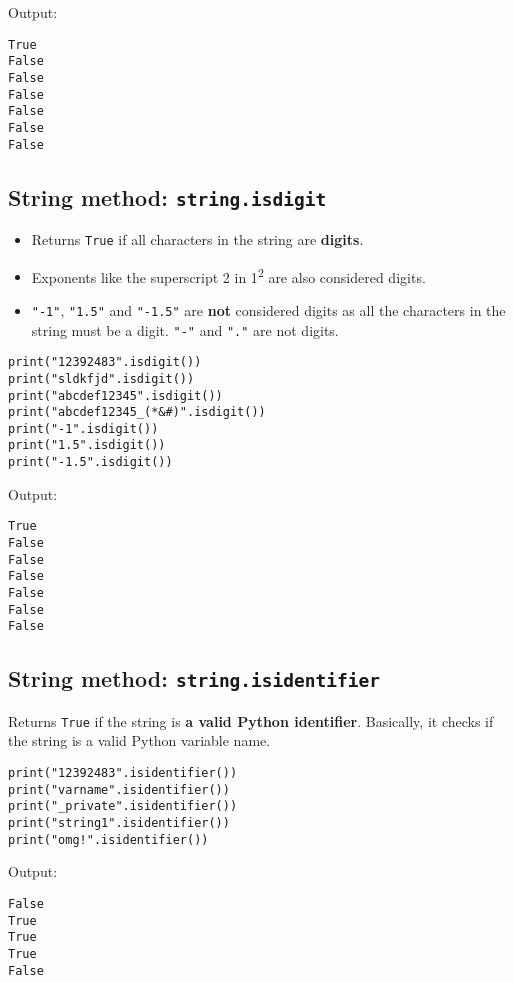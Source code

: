 \documentclass[11pt]{article}
\begin{document}
 \noindent Output:

\begin{verbatim}
True
False
False
False
False
False
False
\end{verbatim}


 \newpage

\subsection{String method: \texttt{string.isdigit}}
\label{sec:org322c0b2}
\begin{itemize}
\item Returns \texttt{True} if all characters in the string are \textbf{digits}.
\item Exponents like the superscript 2 in 1\textsuperscript{2} are also considered digits.
\item \texttt{"-1"}, \texttt{"1.5"} and \texttt{"-1.5"} are \textbf{not} considered digits as all the characters in the string must be a digit. \texttt{"-"} and \texttt{"."} are not digits.
\end{itemize}

\begin{verbatim}
print("12392483".isdigit())
print("sldkfjd".isdigit())
print("abcdef12345".isdigit())
print("abcdef12345_(*&#)".isdigit())
print("-1".isdigit())
print("1.5".isdigit())
print("-1.5".isdigit())
\end{verbatim}

 \noindent Output:

\begin{verbatim}
True
False
False
False
False
False
False
\end{verbatim}

\subsection{String method: \texttt{string.isidentifier}}
\label{sec:org7694ff7}
Returns \texttt{True} if the string is \textbf{a valid Python identifier}. Basically, it checks if the string is a valid Python variable name.

\begin{verbatim}
print("12392483".isidentifier())
print("varname".isidentifier())
print("_private".isidentifier())
print("string1".isidentifier())
print("omg!".isidentifier())
\end{verbatim}

 \noindent Output:

\begin{verbatim}
False
True
True
True
False
\end{verbatim}
\end{document}

